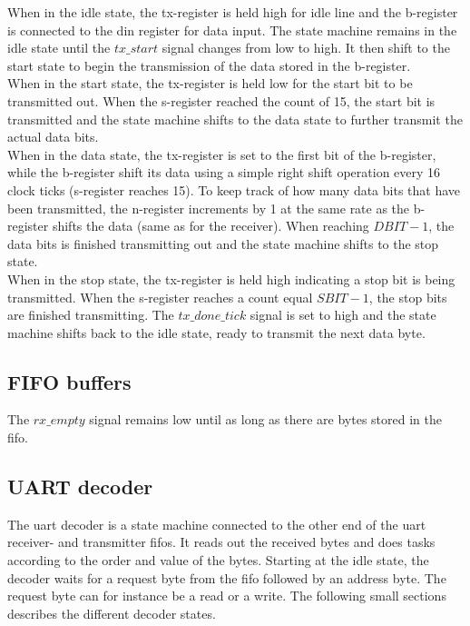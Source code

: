 \documentclass[main.tex]{subfiles}
\begin{document}
When in the idle state, the tx-register is held high for idle line and the b-register is connected to the din register for data input. The state machine remains in the idle state until the $tx\_start$ signal changes from low to high. It then shift to the start state to begin the transmission of the data stored in the b-register. \\

When in the start state, the tx-register is held low for the start bit to be transmitted out. When the s-register reached the count of 15, the start bit is transmitted and the state machine shifts to the data state to further transmit the actual data bits.\\

When in the data state, the tx-register is set to the first bit of the b-register, while the b-register shift its data using a simple right shift operation every 16 clock ticks (s-register reaches 15). To keep track of how many data bits that have been transmitted, the n-register increments by 1 at the same rate as the b-register shifts the data (same as for the receiver). When reaching $DBIT-1$, the data bits is finished transmitting out and the state machine shifts to the stop state.\\

When in the stop state, the tx-register is held high indicating a stop bit is being transmitted. When the s-register reaches a count equal $SBIT - 1$, the stop bits are finished transmitting. The $tx\_done\_tick$ signal is set to high and the state machine shifts back to the idle state, ready to transmit the next data byte.


\subsection{FIFO buffers}
The $rx\_empty$ signal remains low until as long as there are bytes stored in the \gls{fifo}.  

\subsection{UART decoder}
The \gls{uart} decoder is a state machine connected to the other end of the \gls{uart} receiver- and transmitter \glspl{fifo}. It reads out the received bytes and does tasks according to the order and value of the bytes. Starting at the idle state, the decoder waits for a request byte from the fifo followed by an address byte. The request byte can for instance be a read or a write. The following small sections describes the different decoder states. \\
\end{document}
